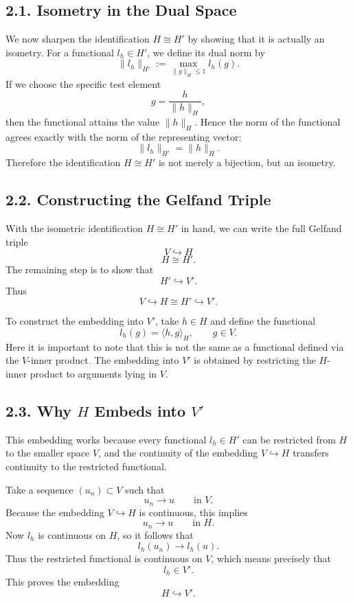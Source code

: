 \documentclass[11pt]{article}
\theoremstyle{definition}
\theoremstyle{remark}
\begin{document}
\subsection*{2.1. Isometry in the Dual Space}
We now sharpen the identification \(H\cong H'\) by showing that it is actually an isometry. For a functional \(l_h\in H'\), we define its dual norm by
\[
\|l_h\|_{H'}
:=
\max_{\|g\|_H\le 1} l_h(g).
\]
If we choose the specific test element
\[
g=\frac{h}{\|h\|_H},
\]
then the functional attains the value \(\|h\|_H\). Hence the norm of the functional agrees exactly with the norm of the representing vector:
\[
\|l_h\|_{H'}=\|h\|_H.
\]
Therefore the identification \(H\cong H'\) is not merely a bijection, but an isometry.

\subsection*{2.2. Constructing the Gelfand Triple}
With the isometric identification \(H\cong H'\) in hand, we can write the full Gelfand triple
\[
V\hookrightarrow H
\]
\[
H\cong H'.
\]
The remaining step is to show that
\[
H'\hookrightarrow V'.
\]
Thus
\[
V\hookrightarrow H\cong H'\hookrightarrow V'.
\]

To construct the embedding into \(V'\), take \(h\in H\) and define the functional
\[
l_h(g)=\langle h,g\rangle_H,
\qquad g\in V.
\]
Here it is important to note that this is not the same as a functional defined via the \(V\)-inner product. The embedding into \(V'\) is obtained by restricting the \(H\)-inner product to arguments lying in \(V\).

\subsection*{2.3. Why \(H\) Embeds into \(V'\)}
This embedding works because every functional \(l_h\in H'\) can be restricted from \(H\) to the smaller space \(V\), and the continuity of the embedding \(V\hookrightarrow H\) transfers continuity to the restricted functional.

Take a sequence \((u_n)\subset V\) such that
\[
u_n\to u
\qquad \text{in } V.
\]
Because the embedding \(V\hookrightarrow H\) is continuous, this implies
\[
u_n\to u
\qquad \text{in } H.
\]
Now \(l_h\) is continuous on \(H\), so it follows that
\[
l_h(u_n)\to l_h(u).
\]
Thus the restricted functional is continuous on \(V\), which means precisely that
\[
l_h\in V'.
\]
This proves the embedding
\[
H\hookrightarrow V'.
\]
\end{document}
